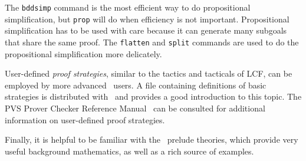 The {\tt bddsimp} command is the most efficient way to do propositional
simplification, but {\tt prop} will do when efficiency is not important.
Propositional simplification has to be used with care because it can
generate many subgoals that share the same proof.  The {\tt flatten}
and {\tt split} commands are used to do the propositional
simplification more delicately.  

User-defined {\em proof strategies\/}, similar to the tactics and
tacticals of LCF, can be employed by more advanced \pvs\ users.  A
file containing definitions of basic strategies is distributed with
\pvs\ and provides a good introduction to this topic. The PVS Prover Checker
Reference Manual~\cite{PVS:prover} can be consulted for additional
information on user-defined proof strategies.

Finally, it is helpful to be familiar with the \pvs\ prelude theories,
which provide very useful background mathematics, as well as a rich
source of examples.









